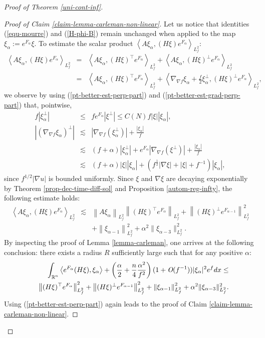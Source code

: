 \documentclass[a4paper,11pt,reqno]{amsart}
\def\R{\mathop{\rm \mathbb{R}}\nolimits}
\begin{document}
\begin{proof}[Proof of Theorem \ref{uni-cont-inf}]
\begin{proof}[Proof of Claim \ref{claim-lemma-carleman-non-linear}]
Let us notice that identities (\ref{equ-mourre}) and (\ref{H-phi-B}) remain unchanged when applied to the map $\xi_{\alpha}:=e^{F_{\alpha}}\xi.$ 
 To estimate the scalar product $\left<A\xi_{\alpha},(H\xi)e^{F_{\alpha}}\right>_{L^2_f}$: 
 \begin{eqnarray*}
\left<A\xi_{\alpha},(H\xi)e^{F_{\alpha}}\right>_{L^2_f}&=&\left<A\xi_{\alpha},(H\xi)^{\top}e^{F_{\alpha}}\right>_{L^2_f}+\left<A\xi_{\alpha},(H\xi)^{\perp}e^{F_{\alpha}}\right>_{L^2_f}\\
&=&\left<A\xi_{\alpha},(H\xi)^{\top}e^{F_{\alpha}}\right>_{L^2_f}+\left<\nabla_{\nabla f}\xi_{\alpha}+\frac{f}{2}\xi_{\alpha}^{\perp},(H\xi)^{\perp}e^{F_{\alpha}}\right>_{L^2_f},
\end{eqnarray*}
we observe by using (\ref{pt-better-est-perp-part}) and (\ref{pt-better-est-grad-perp-part}) that, pointwise,
\begin{eqnarray*}
f\left|\xi_{\alpha}^{\perp}\right|&\leq& fe^{F_{\alpha}}|\xi^{\perp}|\leq C(N)f|\xi||\xi_{\alpha}|,\\
\left|(\nabla_{\nabla f}\xi_{\alpha})^{\perp}\right|&\lesssim& \left|\nabla_{\nabla f}\left(\xi_{\alpha}^{\perp}\right)\right|+\frac{|\xi_{\alpha}|}{f}\\
&\lesssim& (f+\alpha)\left|\xi_{\alpha}^{\perp}\right|+e^{F_{\alpha}}\left|\nabla_{\nabla f}(\xi^{\perp})\right|+\frac{|\xi_{\alpha}|}{f}\\
&\lesssim&(f+\alpha)|\xi||\xi_{\alpha}|+\left(f^{\frac{1}{2}}|\nabla \xi|+|\xi|+f^{-1}\right)|\xi_{\alpha}|,
\end{eqnarray*}
since $f^{1/2}|\nabla u|$ is bounded uniformly. Since $\xi$ and $\nabla \xi$ are decaying exponentially by Theorem \ref{prop-dec-time-diff-sol} and Proposition \ref{autom-reg-infty}, the following estimate holds:
\begin{eqnarray*}
\left<A\xi_{\alpha},(H\xi)e^{F_{\alpha}}\right>_{L^2_f}&\lesssim&\left\|A\xi_{\alpha}\right\|_{L^2_f}\left\|(H\xi)^{\top}e^{F_{\alpha}}\right\|_{L^2_f}+\left\|(H\xi)^{\perp}e^{F_{\alpha-1}}\right\|_{L^2_f}^2\\
&&+\left\|\xi_{\alpha-1}\right\|_{L^2_f}^2+\alpha^2\|\xi_{\alpha-3}\|^2_{L^2_f}.
\end{eqnarray*}
By inspecting the proof of Lemma \ref{lemma-carleman}, one arrives at the following conclusion: there exists a radius $R$ sufficiently large such that for any positive $\alpha$:
\begin{eqnarray*}
&&\int_{\R^n}\left< e^{F_{\alpha}}(H\xi),\xi_{\alpha}\right>+\left(\frac{\alpha}{2}+\frac{n}{4}\frac{\alpha^2}{f^2}\right)(1+\textit{O}(f^{-1}))|\xi_{\alpha}|^2e^fdx\leq\\
&& \left\|(H\xi)^{\top}e^{F_{\alpha}}\right\|_{L^2_f}^2+\left\|(H\xi)^{\perp}e^{F_{\alpha-1}}\right\|_{L^2_f}^2+\left\|\xi_{\alpha-1}\right\|_{L^2_f}^2+\alpha^2\|\xi_{\alpha-3}\|^2_{L^2_f}.
\end{eqnarray*}
Using (\ref{pt-better-est-perp-part}) again leads to the proof of Claim \ref{claim-lemma-carleman-non-linear}.
 \end{proof}
 

\end{proof}
\end{document}
